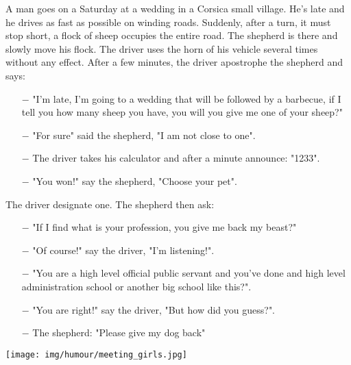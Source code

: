 	\begin{center}\underline{\hspace{5 cm}}\end{center}

	A man goes on a Saturday at a wedding in a Corsica small village. He's late and he drives as fast as possible on winding roads. Suddenly, after a turn, it must stop short, a flock of sheep occupies the entire road. The shepherd is there and slowly move his flock. The driver uses the horn of his vehicle several times without any effect. After a few minutes, the driver apostrophe the shepherd and says:
	\begin{itemize}
		\item[$-$] "I'm late, I'm going to a wedding that will be followed by a barbecue, if I tell you how many sheep you have, you will you give me one of your sheep?"
	
		\item[$-$] "For sure" said the shepherd, "I am not close to one". 
	
		\item[$-$] The driver takes his calculator and after a minute announce: "1233".
	
		\item[$-$] "You won!" say the shepherd, "Choose your pet".
	\end{itemize}
	The driver designate one. The shepherd then ask:
	\begin{itemize}
		\item[$-$] "If I find what is your profession, you give me back my beast?"
	
		\item[$-$] "Of course!" say the driver, "I'm listening!".
	
		\item[$-$] "You are a high level official public servant and you've done and high level administration school or another big school like this?".
	
		\item[$-$] "You are right!" say the driver, "But how did you guess?".
	
		\item[$-$] The shepherd: "Please give my dog back"
	\end{itemize}

	\begin{center}\underline{\hspace{5 cm}}\end{center}

	\begin{center}
		\texttt{[image: img/humour/meeting\_girls.jpg]}
	\end{center}

